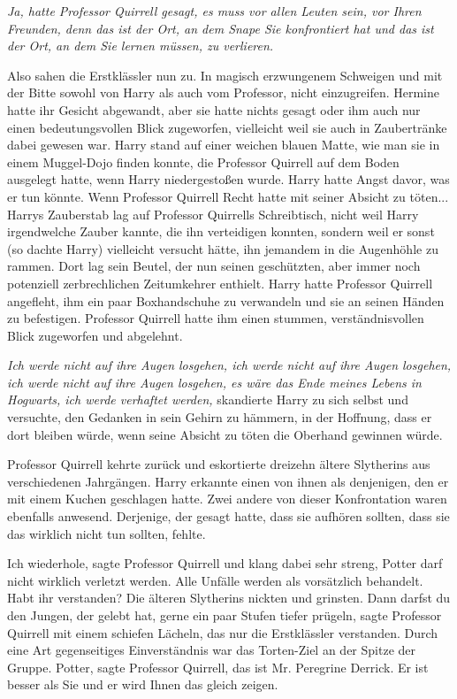 \emph{Ja, hatte Professor Quirrell gesagt, es muss vor allen Leuten sein, vor
Ihren Freunden, denn das ist der Ort, an dem Snape Sie konfrontiert hat und das
ist der Ort, an dem Sie lernen müssen, zu verlieren.}

Also sahen die Erstklässler nun zu. In magisch erzwungenem Schweigen und mit der
Bitte sowohl von Harry als auch vom Professor, nicht einzugreifen. Hermine hatte
ihr Gesicht abgewandt, aber sie hatte nichts gesagt oder ihm auch nur einen
bedeutungsvollen Blick zugeworfen, vielleicht weil sie auch in Zaubertränke
dabei gewesen war. Harry stand auf einer weichen blauen Matte, wie man sie in
einem Muggel-Dojo finden konnte, die Professor Quirrell auf dem Boden ausgelegt
hatte, wenn Harry niedergestoßen wurde. Harry hatte Angst davor, was er tun
könnte. Wenn Professor Quirrell Recht hatte mit seiner Absicht zu töten...
Harrys Zauberstab lag auf Professor Quirrells Schreibtisch, nicht weil Harry
irgendwelche Zauber kannte, die ihn verteidigen konnten, sondern weil er sonst
(so dachte Harry) vielleicht versucht hätte, ihn jemandem in die Augenhöhle zu
rammen. Dort lag sein Beutel, der nun seinen geschützten, aber immer noch
potenziell zerbrechlichen Zeitumkehrer enthielt. Harry hatte Professor Quirrell
angefleht, ihm ein paar Boxhandschuhe zu verwandeln und sie an seinen Händen zu
befestigen. Professor Quirrell hatte ihm einen stummen, verständnisvollen Blick
zugeworfen und abgelehnt.

\emph{Ich werde nicht auf ihre Augen losgehen, ich werde nicht auf ihre Augen
losgehen, ich werde nicht auf ihre Augen losgehen, es wäre das Ende meines
Lebens in Hogwarts, ich werde verhaftet werden,} skandierte Harry zu sich selbst
und versuchte, den Gedanken in sein Gehirn zu hämmern, in der Hoffnung, dass er
dort bleiben würde, wenn seine Absicht zu töten die Oberhand gewinnen würde.

Professor Quirrell kehrte zurück und eskortierte dreizehn ältere Slytherins aus
verschiedenen Jahrgängen. Harry erkannte einen von ihnen als denjenigen, den er
mit einem Kuchen geschlagen hatte. Zwei andere von dieser Konfrontation waren
ebenfalls anwesend. Derjenige, der gesagt hatte, dass sie aufhören sollten, dass
sie das wirklich nicht tun sollten, fehlte.

\glqq Ich wiederhole\grqq{}, sagte Professor Quirrell und klang dabei sehr
streng, \glqq Potter darf nicht wirklich verletzt werden. Alle Unfälle werden
als vorsätzlich behandelt. Habt ihr verstanden?\grqq{} Die älteren Slytherins
nickten und grinsten. \glqq Dann darfst du den Jungen, der gelebt hat, gerne ein
paar Stufen tiefer prügeln\grqq{}, sagte Professor Quirrell mit einem schiefen
Lächeln, das nur die Erstklässler verstanden. Durch eine Art gegenseitiges
Einverständnis war das Torten-Ziel an der Spitze der Gruppe. \glqq
Potter\grqq{}, sagte Professor Quirrell, \glqq das ist Mr. Peregrine Derrick. Er
ist besser als Sie und er wird Ihnen das gleich zeigen.\grqq{}

